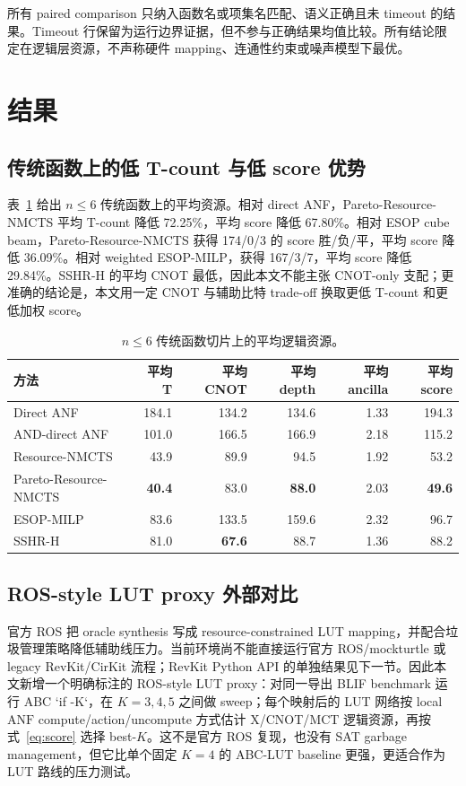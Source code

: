 \documentclass[UTF8,fontset=macnew,11pt]{ctexart}
\newcommand{\method}{Resource-NMCTS}
\newcommand{\anf}{\ensuremath{\mathrm{ANF}}}
\newcommand{\mct}{\ensuremath{\mathrm{MCT}}}
\begin{document}
所有 paired comparison 只纳入函数名或项集名匹配、语义正确且未 timeout 的结果。Timeout 行保留为运行边界证据，但不参与正确结果均值比较。所有结论限定在逻辑层资源，不声称硬件 mapping、连通性约束或噪声模型下最优。

\section{结果}

\subsection{传统函数上的低 T-count 与低 score 优势}

表~\ref{tab:traditional} 给出 $n\leq6$ 传统函数上的平均资源。相对 direct ANF，Pareto-\method{} 平均 T-count 降低 72.25\%，平均 score 降低 67.80\%。相对 ESOP cube beam，Pareto-\method{} 获得 174/0/3 的 score 胜/负/平，平均 score 降低 36.09\%。相对 weighted ESOP-MILP，获得 167/3/7，平均 score 降低 29.84\%。SSHR-H 的平均 CNOT 最低，因此本文不能主张 CNOT-only 支配；更准确的结论是，本文用一定 CNOT 与辅助比特 trade-off 换取更低 T-count 和更低加权 score。

\begin{table}[H]
\centering
\small
\caption{$n\leq6$ 传统函数切片上的平均逻辑资源。}
\label{tab:traditional}
\begin{tabular}{lrrrrr}
\toprule
方法 & 平均 T & 平均 CNOT & 平均 depth & 平均 ancilla & 平均 score \\
\midrule
Direct ANF & 184.1 & 134.2 & 134.6 & 1.33 & 194.3 \\
AND-direct ANF & 101.0 & 166.5 & 166.9 & 2.18 & 115.2 \\
\method{} & 43.9 & 89.9 & 94.5 & 1.92 & 53.2 \\
Pareto-\method{} & \textbf{40.4} & 83.0 & \textbf{88.0} & 2.03 & \textbf{49.6} \\
ESOP-MILP & 83.6 & 133.5 & 159.6 & 2.32 & 96.7 \\
SSHR-H & 81.0 & \textbf{67.6} & 88.7 & 1.36 & 88.2 \\
\bottomrule
\end{tabular}
\end{table}

\subsection{ROS-style LUT proxy 外部对比}

官方 ROS 把 oracle synthesis 写成 resource-constrained LUT mapping，并配合垃圾管理策略降低辅助线压力。当前环境尚不能直接运行官方 ROS/mockturtle 或 legacy RevKit/CirKit 流程；RevKit Python API 的单独结果见下一节。因此本文新增一个明确标注的 ROS-style LUT proxy：对同一导出 BLIF benchmark 运行 ABC `if -K`，在 $K=3,4,5$ 之间做 sweep；每个映射后的 LUT 网络按 local \anf{} compute/action/uncompute 方式估计 X/CNOT/\mct{} 逻辑资源，再按式~\eqref{eq:score} 选择 best-$K$。这不是官方 ROS 复现，也没有 SAT garbage management，但它比单个固定 $K=4$ 的 ABC-LUT baseline 更强，更适合作为 LUT 路线的压力测试。
\end{document}
